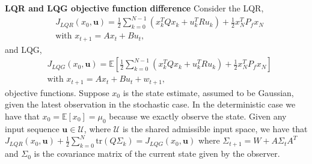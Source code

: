 \begin{thrm}
\textbf{LQR and LQG objective function difference} Consider the LQR, 
\begin{equation}
\begin{aligned}
&J_{LQR}(x_0, \mathbf{u}) = \frac{1}{2}\sum_{k=0}^{N-1} \left( x_k^TQx_k + u_k^TRu_k \right) + \frac{1}{2}x_N^TP_fx_N  \\
&\text{with } x_{t+1} = Ax_t +Bu_t,
\end{aligned}
\label{eq_lqr_obj_func}
\end{equation}
and LQG, 
\begin{equation}
\begin{aligned}
&J_{LQG}(x_0, \mathbf{u}) =  \mathbb{E}\left[ \frac{1}{2}\sum_{k=0}^{N-1} \left( x_k^TQx_k + u_k^TRu_k \right) + \frac{1}{2}x_N^TP_fx_N \right] \\
&\text{with } x_{t+1} = Ax_t +Bu_t + w_{t+1},
\end{aligned}
\label{eq_lqg_obj_func}
\end{equation}
objective functions. Suppose $x_0$ is the state estimate, assumed to be Gaussian, given the latest observation in the stochastic case. In the deterministic case we have that $x_0 = \mathbb{E}[x_0] = \mu_0$ because we exactly observe the state. Given any input sequence $\mathbf{u} \in \mathcal{U}$, where $\mathcal{U}$ is the shared admissible input space, we have that $J_{LQR}(x_0, \mathbf{u}) + \frac{1}{2}\sum_{k=0}^N \text{tr}(Q\Sigma_k) = J_{LQG}(x_0, \mathbf{u})$ where $ \Sigma_{t+1} = W+A\Sigma_t A^T$ and $\Sigma_0$ is the covariance matrix of the current state given by the observer.
\label{thrm_lqr_lqg_diff}
\end{thrm}

